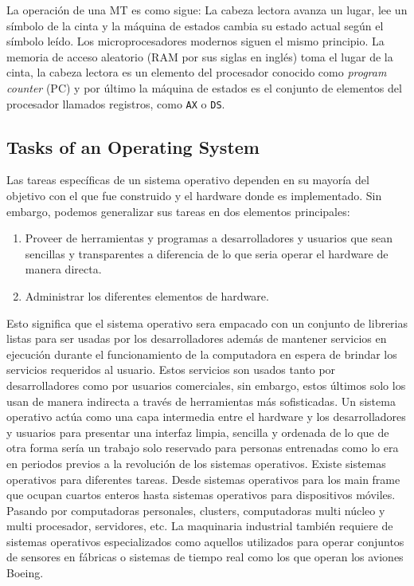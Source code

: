 La operación de una MT es como sigue: La cabeza lectora avanza un lugar, lee un
símbolo de la cinta y la máquina de estados cambia su estado actual según el
símbolo leído.  Los microprocesadores modernos siguen el mismo principio. La
memoria de acceso aleatorio (RAM por sus siglas en inglés) toma el lugar de la
cinta, la cabeza lectora es un elemento del procesador conocido como
\emph{program counter} (PC) y por último la máquina de estados es el conjunto
de elementos del procesador llamados registros, como \texttt{AX} o \texttt{DS}.

\subsection{Tasks of an Operating System}

Las tareas específicas de un sistema operativo dependen en su mayoría del
objetivo con el que fue construido y el hardware donde es implementado. Sin
embargo, podemos generalizar sus tareas en dos elementos principales:

\begin{enumerate}
\item Proveer de herramientas y programas a desarrolladores y usuarios que sean
sencillas y transparentes a diferencia de lo que seria operar el hardware de
manera directa.
\item Administrar los diferentes elementos de hardware.
\end{enumerate}

Esto significa que el sistema operativo sera empacado con un conjunto de
librerias listas para ser usadas por los desarrolladores además de mantener
servicios en ejecución durante el funcionamiento de la computadora en espera de
brindar los servicios requeridos al usuario. Estos servicios son usados tanto
por desarrolladores como por usuarios comerciales, sin embargo, estos últimos
solo los usan de manera indirecta a través de herramientas más sofisticadas.
Un sistema operativo actúa como una capa intermedia entre el hardware y los
desarrolladores y usuarios para presentar una interfaz limpia, sencilla y
ordenada de lo que de otra forma sería un trabajo solo reservado para personas
entrenadas como lo era en periodos previos a la revolución de los sistemas
operativos.  Existe sistemas operativos para diferentes tareas. Desde sistemas
operativos para los main frame que ocupan cuartos enteros hasta sistemas
operativos para dispositivos móviles. Pasando por computadoras personales,
clusters, computadoras multi núcleo y multi procesador, servidores, etc.  La
maquinaria industrial también requiere de sistemas operativos especializados
como aquellos utilizados para operar conjuntos de sensores en fábricas o
sistemas de tiempo real como los que operan los aviones Boeing.

